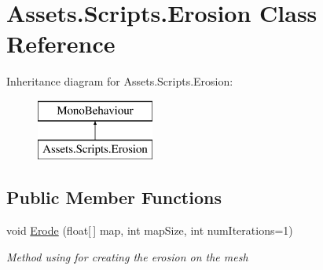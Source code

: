 \hypertarget{class_assets_1_1_scripts_1_1_erosion}{}\section{Assets.\+Scripts.\+Erosion Class Reference}
\label{class_assets_1_1_scripts_1_1_erosion}
Inheritance diagram for Assets.\+Scripts.\+Erosion\+:\begin{figure}[H]
\begin{center}
\leavevmode
\includegraphics[height=2.000000cm]{class_assets_1_1_scripts_1_1_erosion}
\end{center}
\end{figure}
\subsection*{Public Member Functions}
\begin{DoxyCompactItemize}
\item 
void \mbox{\hyperlink{class_assets_1_1_scripts_1_1_erosion_ae9fe52b6ccc11f7cc767976b600367b4}{Erode}} (float\mbox{[}$\,$\mbox{]} map, int map\+Size, int num\+Iterations=1)
\begin{DoxyCompactList}\small\item\em Method using for creating the erosion on the mesh \end{DoxyCompactList}\end{DoxyCompactItemize}
